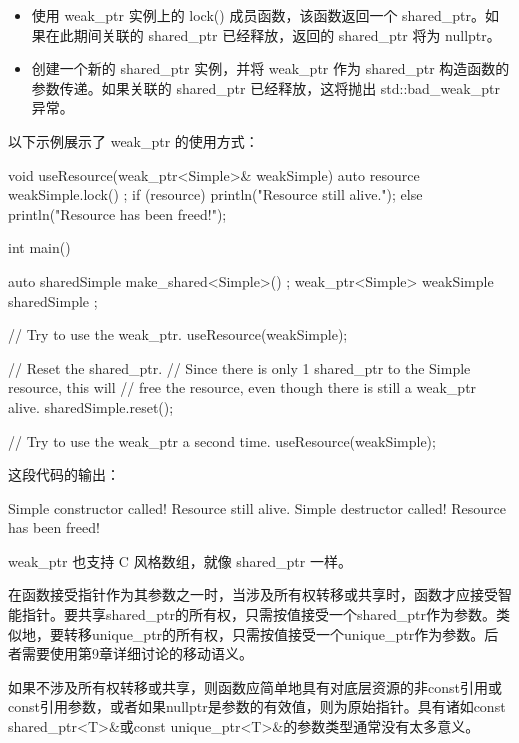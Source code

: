 \begin{itemize}
\item
使用 weak\_ptr 实例上的 lock() 成员函数，该函数返回一个 shared\_ptr。如果在此期间关联的 shared\_ptr 已经释放，返回的 shared\_ptr 将为 nullptr。

\item
创建一个新的 shared\_ptr 实例，并将 weak\_ptr 作为 shared\_ptr 构造函数的参数传递。如果关联的 shared\_ptr 已经释放，这将抛出 std::bad\_weak\_ptr 异常。
\end{itemize}

以下示例展示了 weak\_ptr 的使用方式：

\begin{cpp}
void useResource(weak_ptr<Simple>& weakSimple)
{
    auto resource { weakSimple.lock() };
    if (resource) { println("Resource still alive."); }
    else { println("Resource has been freed!"); }
}

int main()
{
    auto sharedSimple { make_shared<Simple>() };
    weak_ptr<Simple> weakSimple { sharedSimple };

    // Try to use the weak_ptr.
    useResource(weakSimple);

    // Reset the shared_ptr.
    // Since there is only 1 shared_ptr to the Simple resource, this will
    // free the resource, even though there is still a weak_ptr alive.
    sharedSimple.reset();

    // Try to use the weak_ptr a second time.
    useResource(weakSimple);
}
\end{cpp}

这段代码的输出：

\begin{shell}
Simple constructor called!
Resource still alive.
Simple destructor called!
Resource has been freed!
\end{shell}

weak\_ptr 也支持 C 风格数组，就像 shared\_ptr 一样。


在函数接受指针作为其参数之一时，当涉及所有权转移或共享时，函数才应接受智能指针。要共享shared\_ptr的所有权，只需按值接受一个shared\_ptr作为参数。类似地，要转移unique\_ptr的所有权，只需按值接受一个unique\_ptr作为参数。后者需要使用第9章详细讨论的移动语义。

如果不涉及所有权转移或共享，则函数应简单地具有对底层资源的非const引用或const引用参数，或者如果nullptr是参数的有效值，则为原始指针。具有诸如const shared\_ptr<T>\&或const unique\_ptr<T>\&的参数类型通常没有太多意义。

